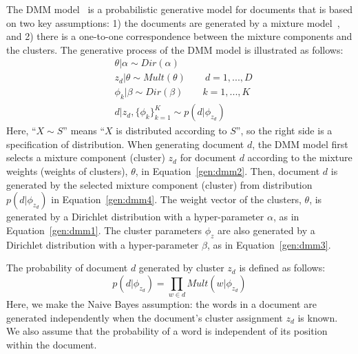 The DMM model~\cite{nigam2000text} is a probabilistic generative model for documents that is based on two key assumptions: 1) the documents are generated by a mixture model~\cite{mclachlan_basford88}, and 2) there is a one-to-one correspondence between the mixture components and the clusters. The generative process of the DMM model is illustrated as follows:
\begin{align}
    & \label{gen:dmm1}
    \theta|\alpha \sim Dir(\alpha) \\
    & \label{gen:dmm2}
    z_d|\theta \sim Mult(\theta) \qquad d=1,...,D\\
    & \label{gen:dmm3}
    \phi_k|\beta \sim Dir(\beta) \qquad k=1,...,K\\
    & \label{gen:dmm4}
    d|z_d,\{\phi_k\}_{k=1}^K \sim p(d | \phi_{z_d})
\end{align}
Here, ``$X \sim S$'' means ``$X$ is distributed according to $S$'', so the right side is a specification of distribution. When generating document $d$, the DMM model first selects a mixture component (cluster) $z_d$ for document $d$ according to the mixture weights (weights of clusters), $\theta$, in Equation~\eqref{gen:dmm2}. Then, document $d$ is generated by the selected mixture component (cluster) from distribution $p(d | \phi_{z_d})$ in Equation~\eqref{gen:dmm4}. The weight vector of the clusters, $\theta$, is generated by a Dirichlet distribution with a hyper-parameter $\alpha$, as in Equation~\eqref{gen:dmm1}. The cluster parameters $\phi_z$ are also generated by a Dirichlet distribution with a hyper-parameter $\beta$, as in Equation~\eqref{gen:dmm3}.

The probability of document $d$ generated by cluster $z_d$ is defined as follows:
\begin{equation} \label{eq:Pdz}
    p(d | \phi_{z_d}) = \prod_{w \in d} Mult(w|\phi_{z_d})
\end{equation}
Here, we make the Naive Bayes assumption: the words in a document are generated independently when the document's cluster assignment $z_d$ is known. We also assume that the probability of a word is independent of its position within the document.

